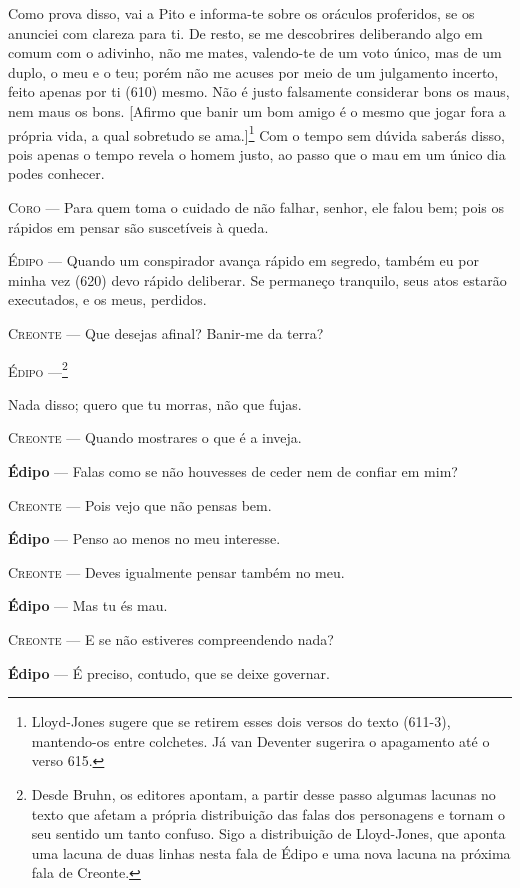 Como prova disso, vai a Pito e informa-te sobre os oráculos proferidos,
se os anunciei com clareza para ti. De resto, se me descobrires
deliberando algo em comum com o adivinho, não me mates, valendo-te de um
voto único, mas de um duplo, o meu e o teu; porém não me acuses por meio
de um julgamento incerto, feito apenas por ti (610) mesmo. Não é justo
falsamente considerar bons os maus, nem maus os bons. {[}Afirmo que
banir um bom amigo é o mesmo que jogar fora a própria vida, a qual
sobretudo se ama.{]}\footnote{Lloyd-Jones sugere que se retirem esses
  dois versos do texto (611-3), mantendo-os entre colchetes. Já van
  Deventer sugerira o apagamento até o verso 615.} Com o tempo sem
dúvida saberás disso, pois apenas o tempo revela o homem justo, ao passo
que o mau em um único dia podes conhecer.

\textsc{Coro} --- Para quem toma o cuidado de não falhar, senhor, ele falou bem; pois os
rápidos em pensar são suscetíveis à queda.

\textsc{Édipo} --- Quando um conspirador avança rápido em segredo, também eu por minha vez
(620) devo rápido deliberar. Se permaneço tranquilo, seus atos estarão
executados, e os meus, perdidos.

\textsc{Creonte} --- Que desejas afinal? Banir-me da terra?

\textsc{Édipo} ---\footnote{Desde Bruhn, os editores apontam, a partir desse
  passo algumas lacunas no texto que afetam a própria distribuição das
  falas dos personagens e tornam o seu sentido um tanto confuso. Sigo a
  distribuição de Lloyd-Jones, que aponta uma lacuna de duas linhas
  nesta fala de Édipo e uma nova lacuna na próxima fala de Creonte.}

Nada disso; quero que tu morras, não que fujas.

\textsc{Creonte} --- Quando mostrares o que é a inveja.

\textbf{Édipo} --- Falas como se não houvesses de ceder nem de confiar em mim?

\textsc{Creonte} --- Pois vejo que não pensas bem.

\textbf{Édipo} --- Penso ao menos no meu interesse.

\textsc{Creonte} --- Deves igualmente pensar também no meu.

\textbf{Édipo} --- Mas tu és mau.

\textsc{Creonte} --- E se não estiveres compreendendo nada?

\textbf{Édipo} --- É preciso, contudo, que se deixe governar.


